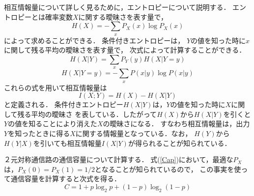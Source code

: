 \documentclass[a4j,twocolumn]{jarticle}
\def \figref #1{\figurename\ref{#1}}
\begin{document}
相互情報量について詳しく見るために，エントロピーについて説明する．
エントロピーとは確率変数$X$に関する曖昧さを表す量で，
$$
H(X)=-\sum_xP_X(x)\log P_X(x)
$$
によって求めることができる．
条件付きエントロピーは，
$Y$の値を知った時に$x$に関して残る平均の曖昧さを表す量で，
次式によって計算することができる．
$$
H(X|Y)=\sum_xP_Y(y)H(X|Y=y)$$
$$
H(X|Y=y)=-\sum_xP(x|y)\log P(x|y)
$$
これらの式を用いて相互情報量は
$$
I(X;Y)=H(X)-H(X|Y)
$$
と定義される．
条件付きエントロピー$H(X|Y)$は，$Y$の値を知った時に$X$に関して残る平均の曖昧さ
を表している．したがって$H(X)$から$H(X|Y)$を引くと$Y$の値を知ることにより消えた$X$の曖昧さになる．
すなわち相互情報量は，出力$Y$を知ったときに得る$X$に関する情報量となっている．なお，
$H(Y)$から$H(Y|X)$を引いても相互情報量$I(X|Y)$が得られることが知られている．

２元対称通信路の通信容量について計算する．
式(\ref{Cap})において，最適な$P_X$は，$P_X(0)=P_X(1)=1/2$となることが知られているので，
この事実を使って通信容量を計算すると次式を得る．
\begin{equation}\label{C2}
  C=1+p\log_2p+(1-p)\log_2(1-p)  
\end{equation}
\end{document}
